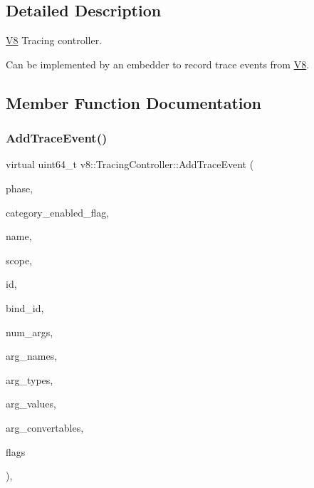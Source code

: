 \subsection{Detailed Description}
\mbox{\hyperlink{classv8_1_1V8}{V8}} Tracing controller.

Can be implemented by an embedder to record trace events from \mbox{\hyperlink{classv8_1_1V8}{V8}}. 

\subsection{Member Function Documentation}
\mbox{\label{classv8_1_1TracingController_ad1e234b340ea8f9f1e3386aa21dad5dd}} 
\subsubsection{\texorpdfstring{Add\+Trace\+Event()}{AddTraceEvent()}}
{\footnotesize\ttfamily virtual uint64\+\_\+t v8\+::\+Tracing\+Controller\+::\+Add\+Trace\+Event (\begin{DoxyParamCaption}\item[{char}]{phase,  }\item[{const uint8\+\_\+t $\ast$}]{category\+\_\+enabled\+\_\+flag,  }\item[{const char $\ast$}]{name,  }\item[{const char $\ast$}]{scope,  }\item[{uint64\+\_\+t}]{id,  }\item[{uint64\+\_\+t}]{bind\+\_\+id,  }\item[{int32\+\_\+t}]{num\+\_\+args,  }\item[{const char $\ast$$\ast$}]{arg\+\_\+names,  }\item[{const uint8\+\_\+t $\ast$}]{arg\+\_\+types,  }\item[{const uint64\+\_\+t $\ast$}]{arg\+\_\+values,  }\item[{std\+::unique\+\_\+ptr$<$ \mbox{\hyperlink{classv8_1_1ConvertableToTraceFormat}{Convertable\+To\+Trace\+Format}} $>$ $\ast$}]{arg\+\_\+convertables,  }\item[{unsigned int}]{flags }\end{DoxyParamCaption})\hspace{0.3cm}{\ttfamily [inline]}, {\ttfamily [virtual]}}

